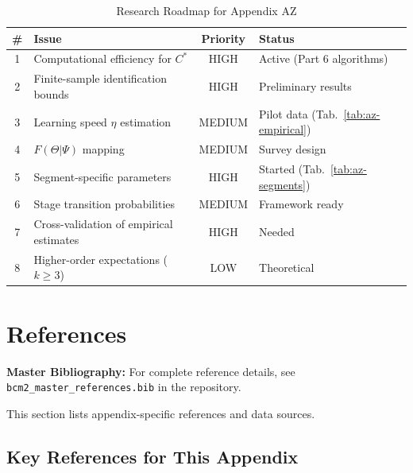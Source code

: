 \begin{table}[htbp]
\centering
\caption{Research Roadmap for Appendix AZ}
\label{tab:az-roadmap}
\renewcommand{\arraystretch}{1.3}
\begin{tabular}{@{}clcl@{}}
\toprule
\textbf{\#} & \textbf{Issue} & \textbf{Priority} & \textbf{Status} \\
\midrule
1 & Computational efficiency for $C^*$ & HIGH & Active (Part 6 algorithms) \\
2 & Finite-sample identification bounds & HIGH & Preliminary results \\
3 & Learning speed $\eta$ estimation & MEDIUM & Pilot data (Tab.~\ref{tab:az-empirical}) \\
4 & $F(\Theta|\Psi)$ mapping & MEDIUM & Survey design \\
5 & Segment-specific parameters & HIGH & Started (Tab.~\ref{tab:az-segments}) \\
6 & Stage transition probabilities & MEDIUM & Framework ready \\
7 & Cross-validation of empirical estimates & HIGH & Needed \\
8 & Higher-order expectations ($k \geq 3$) & LOW & Theoretical \\
\bottomrule
\end{tabular}
\end{table}


\section{References}
\label{sec:az-references}

\begin{tcolorbox}[colback=blue!5!white, colframe=blue!75!black]
\textbf{Master Bibliography:} For complete reference details, see
\texttt{bcm2\_master\_references.bib} in the repository.

This section lists appendix-specific references and data sources.
\end{tcolorbox}

\vspace{0.5em}

\subsection{Key References for This Appendix}

